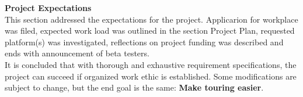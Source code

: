 \textbf{Project Expectations} \\
This section addressed the expectations for the project. Applicarion for workplace was filed, expected work load was outlined in the section Project Plan, requested platform(s) was investigated, reflections on project funding was described and ends with announcement of beta testers. \\

It is concluded that with thorough and exhaustive requirement specifications, the project can succeed if organized work ethic is established. Some modifications are subject to change, but the end goal is the same: \textbf{Make touring easier}.